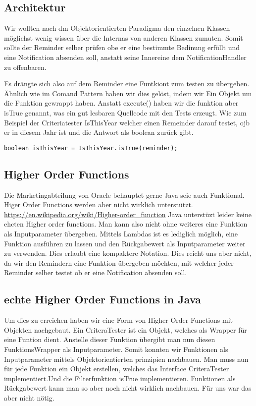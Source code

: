 \subsection{Architektur}
Wir wollten nach dm Objektorientierten Paradigma den einzelnen Klassen möglichst wenig wissen über die Internas von anderen Klassen zumuten.
Somit sollte der Reminder selber prüfen obe er eine bestimmte Bedinung erfüllt und eine Notification absenden soll, anstatt seine Innereine dem NotificationHandler zu offenbaren. 

Es drängte sich also auf dem Reminder eine Funtkiont zum testen zu übergeben. Ähnlich wie im Comand Pattern haben wir dies gelöst, indem wir Ein Objekt um die Funktion gewrappt haben. Anstatt execute() haben wir die funktion aber isTrue genannt, was ein gut lesbaren Quellcode mit den Tests erzeugt.
Wie zum Beispiel der Criteriatester IsThisYear welcher einen Remeinder darauf testet, ojb er in diesem Jahr ist und die Antwort als boolean zurück gibt.
\begin{lstlisting}
boolean isThisYear = IsThisYear.isTrue(reminder);
\end{lstlisting}
\subsection{ Higher Order Functions}
  Die Marketingabteilung von Oracle behauptet gerne Java seie auch Funktional. Higer Order Functions werden aber nicht wirklich unterstützt. 
  \url{https://en.wikipedia.org/wiki/Higher-order_function}
  Java unterstüzt leider keine ehcten Higher order functions. Man kann also nicht ohne weiteres eine Funktion als Inputparameter übergeben.
  Mittels Lambdas ist es lediglich möglich, eine Funktion ausführen zu lassen und den Rückgabewert als Inputparameter weiter zu verwenden. Dies erlaubt eine kompaktere Notation. Dies reicht uns aber nicht, da wir den Remindern eine Funktion übergeben möchten, mit welcher jeder Reminder selber testet ob er eine Notification absenden soll. 
  
  \subsection{echte Higher Order Functions in Java}
  Um dies zu erreichen haben wir eine Form von Higher Order Functions mit Objekten nachgebaut. 
  Ein CriteraTester ist ein Objekt, welches als Wrapper für eine Funtion dient. Anstelle dieser Funktion übergibt man nun diesen FunktionsWrapper als Inputparameter. Somit konnten wir Funktionen als Inputparameter mittels Objektorientierten prinzipien nachbauen.
  Man muss nun für jede Funktion ein Objekt erstellen, welches das Interface CriteraTester implementiert.Und die Filterfunktion isTrue implementieren.
  Funktionen als Rückgabewert kann man so aber noch nicht wirklich nachbauen. Für uns war das aber nicht nötig.
  
